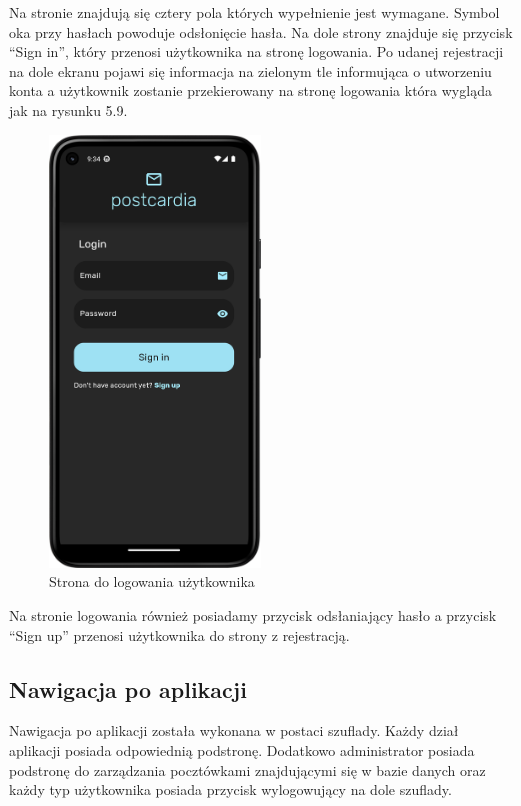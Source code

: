 \documentclass[a4paper,twoside,12pt]{book}
\begin{document}
Na stronie znajdują się cztery pola których wypełnienie jest wymagane. Symbol oka przy hasłach powoduje odsłonięcie hasła. Na dole strony znajduje się przycisk ``Sign in'', który przenosi użytkownika na stronę logowania. 
Po udanej rejestracji na dole ekranu pojawi się informacja na zielonym tle informująca o utworzeniu konta a użytkownik zostanie przekierowany na stronę logowania która wygląda jak na rysunku 5.9.

\begin{figure}[H]
    \centering
    \includegraphics[width=0.5\textwidth]{mobile_ss/logowanie.png}
    \caption{Strona do logowania użytkownika}
\end{figure}

Na stronie logowania również posiadamy przycisk odsłaniający hasło a przycisk ``Sign up'' przenosi użytkownika do strony z rejestracją. 
\newpage
\subsection{Nawigacja po aplikacji}
Nawigacja po aplikacji została wykonana w postaci szuflady. Każdy dział aplikacji posiada odpowiednią podstronę. Dodatkowo administrator posiada podstronę do zarządzania pocztówkami znajdującymi się w bazie danych oraz każdy typ użytkownika posiada przycisk wylogowujący na dole szuflady.
\end{document}
